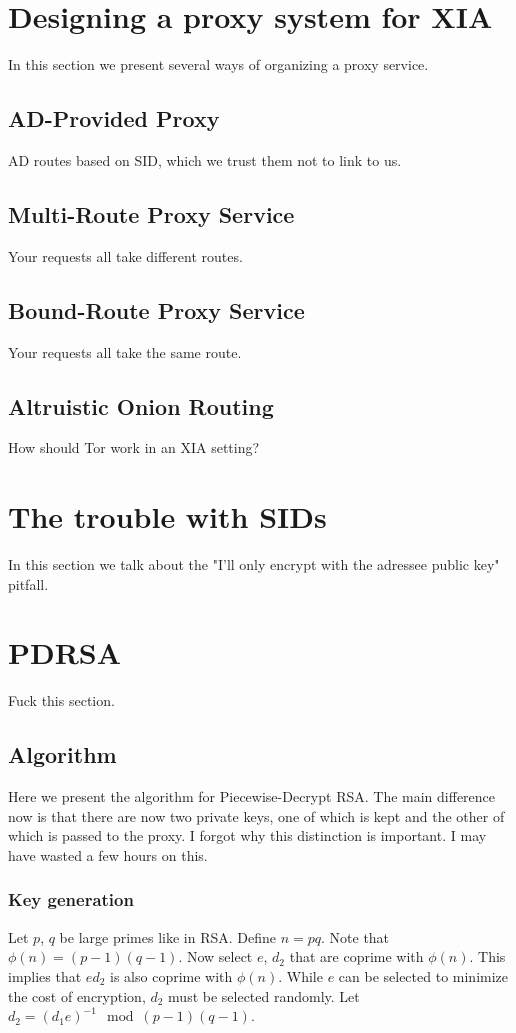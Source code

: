 \documentclass{article}
\begin{document}
\section{Designing a proxy system for XIA}
In this section we present several ways of organizing a proxy service.
\subsection{AD-Provided Proxy}
AD routes based on SID, which we trust them not to link to us.
\subsection{Multi-Route Proxy Service}
Your requests all take different routes.
\subsection{Bound-Route Proxy Service}
Your requests all take the same route.
\subsection{Altruistic Onion Routing}
How should Tor work in an XIA setting?
\section{The trouble with SIDs}
In this section we talk about the "I'll only encrypt with the adressee public key" pitfall.
\section{PDRSA}
Fuck this section.
\subsection{Algorithm}
Here we present the algorithm for Piecewise-Decrypt RSA.  The main difference now is that there are now two private keys, one of which is kept and the other of which is passed  to the proxy.  I forgot why this distinction is important.  I may have wasted a few hours on this.
\subsubsection{Key generation}
Let $p$, $q$ be large primes like in RSA. Define $n = pq$. Note that $\phi(n) = (p-1)(q-1)$. Now select $e$, $d_2$ that are coprime with $\phi(n)$.  This implies that $ed_2$ is also coprime with $\phi(n)$.  While $e$ can be selected to minimize the cost of encryption, $d_2$ must be selected randomly.  Let $d_2 = (d_1e)^{-1} \mod(p-1)(q-1)$.  
\end{document}
